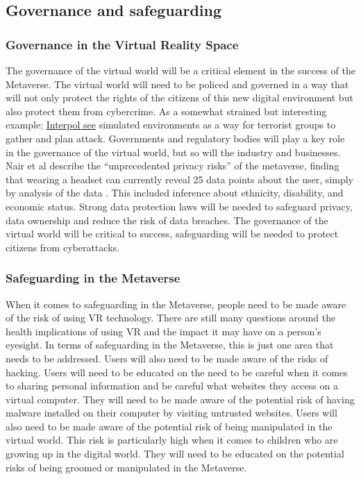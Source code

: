 \subsection{Governance and safeguarding}
\subsubsection{Governance in the Virtual Reality Space}
The governance of the virtual world will be a critical element in the success of the Metaverse. The virtual world will need to be policed and governed in a way that will not only protect the rights of the citizens of this new digital environment but also protect them from cybercrime. As a somewhat strained but interesting example; \href{https://www.reuters.com/technology/interpol-says-metaverse-opens-up-new-world-cybercrime-2022-10-27/}{Interpol see} simulated environments as a way for terrorist groups to gather and plan attack. Governments and regulatory bodies will play a key role in the governance of the virtual world, but so will the industry and businesses. Nair et al describe the ``unprecedented privacy risks'' of the metaverse, finding that wearing a headset can currently reveal 25 data points about the user, simply by analysis of the data \cite{nair2022exploring, Nair2023}.  This included inference about ethnicity, disability, and economic status. Strong data protection laws will be needed to safeguard privacy, data ownership and reduce the risk of data breaches. The governance of the virtual world will be critical to success, safeguarding will be needed to protect citizens from cyberattacks.
\subsubsection{Safeguarding in the Metaverse}
When it comes to safeguarding in the Metaverse, people need to be made aware of the risk of using VR technology. There are still many questions around the health implications of using VR and the impact it may have on a person’s eyesight. In terms of safeguarding in the Metaverse, this is just one area that needs to be addressed. Users will also need to be made aware of the risks of hacking. Users will need to be educated on the need to be careful when it comes to sharing personal information and be careful what websites they access on a virtual computer. They will need to be made aware of the potential risk of having malware installed on their computer by visiting untrusted websites. Users will also need to be made aware of the potential risk of being manipulated in the virtual world. This risk is particularly high when it comes to children who are growing up in the digital world. They will need to be educated on the potential risks of being groomed or manipulated in the Metaverse.\\

